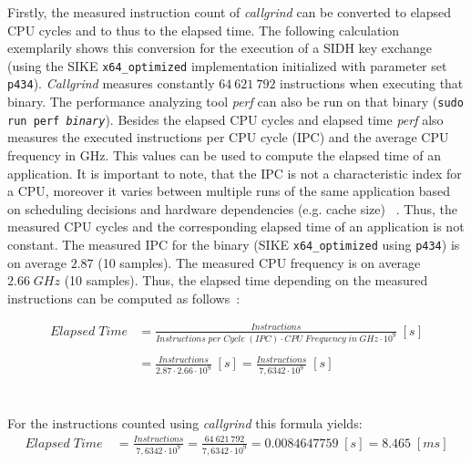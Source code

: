 Firstly, the measured instruction count of \textit{callgrind} can be converted to elapsed \gls{CPU} cycles and to thus to the elapsed time. The following calculation exemplarily shows this conversion for the execution of a SIDH key exchange (using the \gls{SIKE} \texttt{x64\_optimized} implementation initialized with parameter set \texttt{p434}). \textit{Callgrind} measures constantly $64\:621\:792$ instructions when executing that binary. The performance analyzing tool \textit{perf} can also be run on that binary (\texttt{sudo run perf \textit{binary}}). Besides the elapsed \gls{CPU} cycles and elapsed time \textit{perf} also measures the executed instructions per \gls{CPU} cycle (\gls{IPC}) and the average \gls{CPU} frequency in GHz. This values can be used to compute the elapsed time of an application. It is important to note, that the \gls{IPC} is not a characteristic index for a \gls{CPU}, moreover it varies between multiple runs of the same application based on scheduling decisions and hardware dependencies (e.g. cache size) ~\parencite{alameldeen2006ipc}. Thus, the measured \gls{CPU} cycles and the corresponding elapsed time of an application is not constant. The measured \gls{IPC} for the binary (\gls{SIKE} \texttt{x64\_optimized} using \texttt{p434}) is on average $2.87$ (10 samples). The measured \gls{CPU} frequency is on average $2.66\;GHz$ (10 samples). Thus, the elapsed time depending on the measured instructions can be computed as follows~\parencite{alameldeen2006ipc}:

\begin{equation*}
\begin{split}
Elapsed\;Time & = \frac{Instructions}{Instructions\;per\;Cycle\;(IPC)\cdot CPU\; Frequency\;in\;GHz\cdot 10^9}\;[s] \\\\
& = \frac{Instructions}{2.87\cdot 2.66\cdot 10^9}\;[s] = \frac{Instructions}{7,6342\cdot 10^9}\;[s] 
\end{split}
\end{equation*}
\\\\For the instructions counted using \textit{callgrind} this formula yields:
\begin{equation*}
\begin{split}
Elapsed\;Time\ & = \frac{Instructions}{7,6342\cdot 10^9} = \frac{64\:621\:792}{7,6342\cdot 10^9} = 0.0084647759\;[s] = 8.465\;[ms]
\end{split}
\end{equation*}

